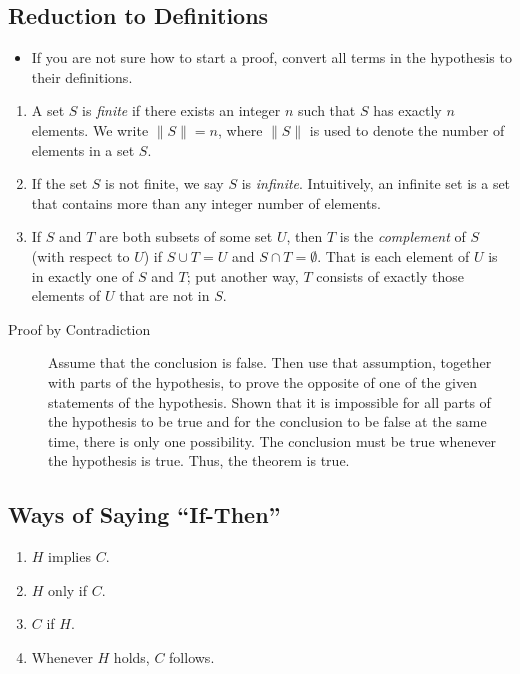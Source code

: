 \documentclass[]{article}
\begin{document}
  \subsection*{Reduction to Definitions}
    \begin{itemize}
      \item If you are not sure how to start a proof, convert all terms in the
      hypothesis to their definitions.
    \end{itemize}
    \begin{enumerate}
      \item A set $S$ is \emph{finite} if there exists an integer $n$ such that
      $S$ has exactly $n$ elements. We write $\|S\| = n$, where $\|S\|$ is used 
      to denote the number of elements in a set $S$.
      \item If the set $S$ is not finite, we say $S$ is \emph{infinite}.
      Intuitively, an infinite set is a set that contains more than any integer
      number of elements.
      \item If $S$ and $T$ are both subsets of some set $U$, then $T$ is the
      \emph{complement} of $S$ (with respect to $U$) if $S \cup T = U$ and
      $S \cap T = \emptyset$. That is each element of $U$ is in exactly one of
      $S$ and $T$; put another way, $T$ consists of exactly those elements of
      $U$ that are not in $S$.
    \end{enumerate}
    \begin{description}
      \item[Proof by Contradiction] Assume that the conclusion is false. Then
      use that assumption, together with parts of the hypothesis, to prove the
      opposite of one of the given statements of the hypothesis. Shown that it
      is impossible for all parts of the hypothesis to be true and for the
      conclusion to be false at the same time, there is only one possibility.
      The conclusion must be true whenever the hypothesis is true. Thus, the
      theorem is true.
    \end{description}
  
  \subsection*{Ways of Saying ``If-Then''}
    \begin{enumerate}
      \item $H$ implies $C$.
      \item $H$ only if $C$.
      \item $C$ if $H$.
      \item Whenever $H$ holds, $C$ follows.
    \end{enumerate}
\end{document}
